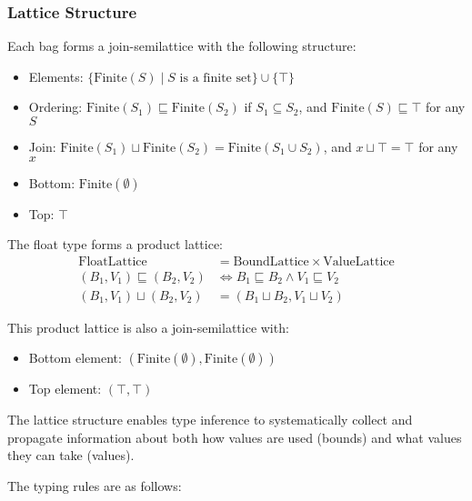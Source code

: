 \subsubsection{Lattice Structure}

Each bag forms a join-semilattice with the following structure:
\begin{itemize}
    \item Elements: $\{\text{Finite}(S) \mid S \text{ is a finite set}\} \cup \{\top\}$
    \item Ordering: $\text{Finite}(S_1) \sqsubseteq \text{Finite}(S_2)$ if $S_1 \subseteq S_2$, and $\text{Finite}(S) \sqsubseteq \top$ for any $S$
    \item Join: $\text{Finite}(S_1) \sqcup \text{Finite}(S_2) = \text{Finite}(S_1 \cup S_2)$, and $x \sqcup \top = \top$ for any $x$
    \item Bottom: $\text{Finite}(\emptyset)$
    \item Top: $\top$
\end{itemize}

The float type forms a product lattice:
\begin{align}
\text{FloatLattice} &= \text{BoundLattice} \times \text{ValueLattice} \\
(B_1, V_1) \sqsubseteq (B_2, V_2) &\iff B_1 \sqsubseteq B_2 \land V_1 \sqsubseteq V_2 \\
(B_1, V_1) \sqcup (B_2, V_2) &= (B_1 \sqcup B_2, V_1 \sqcup V_2)
\end{align}

This product lattice is also a join-semilattice with:
\begin{itemize}
    \item Bottom element: $(\text{Finite}(\emptyset), \text{Finite}(\emptyset))$
    \item Top element: $(\top, \top)$
\end{itemize}

The lattice structure enables type inference to systematically collect and propagate information about both how values are used (bounds) and what values they can take (values).



The typing rules are as follows:

